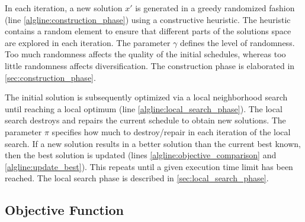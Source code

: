 In each iteration, a new solution $x'$ is generated in a greedy randomized fashion (line \ref{algline:construction_phase}) using a constructive heuristic. The heuristic contains a random element to ensure that different parts of the solutions space are explored in each iteration. The parameter $\gamma$ defines the level of randomness. Too much randomness affects the quality of the initial schedules, whereas too little randomness affects diversification. The construction phase is elaborated in \autoref{sec:construction_phase}.

The initial solution is subsequently optimized via a local neighborhood search until reaching a local optimum (line \ref{algline:local_search_phase}). The local search destroys and repairs the current schedule to obtain new solutions. The parameter $\pi$ specifies how much to destroy/repair in each iteration of the local search. If a new solution results in a better solution than the current best known, then the best solution is updated (lines \ref{algline:objective_comparison} and \ref{algline:update_best}). This repeats until a given execution time limit has been reached. The local search phase is described in \autoref{sec:local_search_phase}.

\subsection{Objective Function} \label{sec:objective_function}

